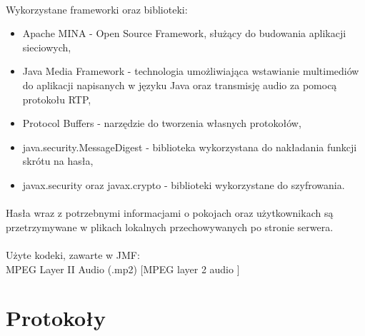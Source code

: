 \documentclass{article}
\begin{document}
	\paragraph*{} Wykorzystane frameworki oraz biblioteki:
	\begin{itemize}
		\item Apache MINA - Open Source Framework, służący do budowania aplikacji sieciowych,
		\item Java Media Framework - technologia umożliwiająca wstawianie multimediów do aplikacji napisanych w języku Java oraz transmisję audio za pomocą protokołu RTP,
		\item Protocol Buffers - narzędzie do tworzenia własnych protokołów,
		\item java.security.MessageDigest - biblioteka wykorzystana do nakładania funkcji skrótu na hasła,
		\item javax.security oraz javax.crypto - biblioteki wykorzystane do szyfrowania.
	\end{itemize}
	\paragraph*{} Hasła wraz z potrzebnymi informacjami o pokojach oraz użytkownikach są przetrzymywane w plikach lokalnych przechowywanych po stronie serwera.
	\paragraph*{} Użyte kodeki, zawarte w JMF:\\ MPEG Layer II Audio (.mp2) [MPEG layer 2 audio ]
	\section{Protokoły}
\end{document}
